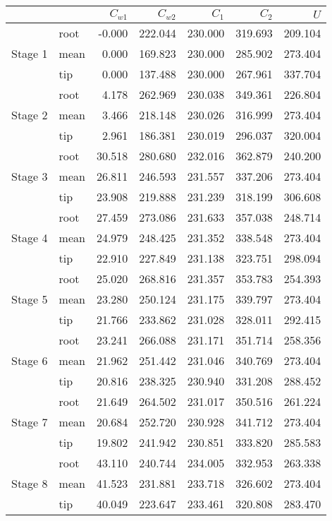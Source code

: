 \begin{center}
\begin{tabular}{llrrrrr}
\toprule
 &  & $C_{w1}$ & $C_{w2}$ & $C_{1}$ & $C_{2}$ & $U$ \\
\midrule
\multirow[t]{3}{*}{Stage 1} & root & -0.000 & 222.044 & 230.000 & 319.693 & 209.104 \\
 & mean & 0.000 & 169.823 & 230.000 & 285.902 & 273.404 \\
 & tip & 0.000 & 137.488 & 230.000 & 267.961 & 337.704 \\
\cline{1-7}
\multirow[t]{3}{*}{Stage 2} & root & 4.178 & 262.969 & 230.038 & 349.361 & 226.804 \\
 & mean & 3.466 & 218.148 & 230.026 & 316.999 & 273.404 \\
 & tip & 2.961 & 186.381 & 230.019 & 296.037 & 320.004 \\
\cline{1-7}
\multirow[t]{3}{*}{Stage 3} & root & 30.518 & 280.680 & 232.016 & 362.879 & 240.200 \\
 & mean & 26.811 & 246.593 & 231.557 & 337.206 & 273.404 \\
 & tip & 23.908 & 219.888 & 231.239 & 318.199 & 306.608 \\
\cline{1-7}
\multirow[t]{3}{*}{Stage 4} & root & 27.459 & 273.086 & 231.633 & 357.038 & 248.714 \\
 & mean & 24.979 & 248.425 & 231.352 & 338.548 & 273.404 \\
 & tip & 22.910 & 227.849 & 231.138 & 323.751 & 298.094 \\
\cline{1-7}
\multirow[t]{3}{*}{Stage 5} & root & 25.020 & 268.816 & 231.357 & 353.783 & 254.393 \\
 & mean & 23.280 & 250.124 & 231.175 & 339.797 & 273.404 \\
 & tip & 21.766 & 233.862 & 231.028 & 328.011 & 292.415 \\
\cline{1-7}
\multirow[t]{3}{*}{Stage 6} & root & 23.241 & 266.088 & 231.171 & 351.714 & 258.356 \\
 & mean & 21.962 & 251.442 & 231.046 & 340.769 & 273.404 \\
 & tip & 20.816 & 238.325 & 230.940 & 331.208 & 288.452 \\
\cline{1-7}
\multirow[t]{3}{*}{Stage 7} & root & 21.649 & 264.502 & 231.017 & 350.516 & 261.224 \\
 & mean & 20.684 & 252.720 & 230.928 & 341.712 & 273.404 \\
 & tip & 19.802 & 241.942 & 230.851 & 333.820 & 285.583 \\
\cline{1-7}
\multirow[t]{3}{*}{Stage 8} & root & 43.110 & 240.744 & 234.005 & 332.953 & 263.338 \\
 & mean & 41.523 & 231.881 & 233.718 & 326.602 & 273.404 \\
 & tip & 40.049 & 223.647 & 233.461 & 320.808 & 283.470 \\
\cline{1-7}
\bottomrule
\end{tabular}
\end{center}

